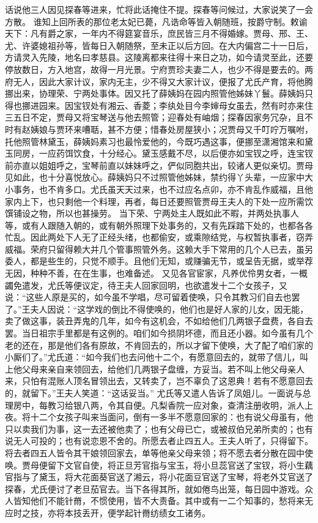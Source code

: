 \documentclass[12pt,oneside]{book}
\begin{document}
话说他三人因见探春等进来，忙将此话掩住不提。探春等问候过，大家说笑了一会方散。
谁知上回所表的那位老太妃已薨，凡诰命等皆入朝随班，按爵守制。敕谕天下：凡有爵之家，一年内不得筵宴音乐，庶民皆三月不得婚嫁。贾母、邢、王、尤、许婆媳祖孙等，皆每日入朝随祭，至未正以后方回。在大内偏宫二十一日后，方请灵入先陵，地名曰孝慈县。这陵离都来往得十来日之功，如今请灵至此，还要停放数日，方入地宫，故得一月光景。宁府贾珍夫妻二人，也少不得是要去的。两府无人，因此大家计议，家内无主，少不得又大家计议，便报了尤氏产育，将他腾挪出来，协理荣、宁两处事体。因又托了薛姨妈在园内照管他姊妹丫鬟。薛姨妈只得也挪进园来。因宝钗处有湘云、香菱；李纨处目今李婶母女虽去，然有时亦来住三五日不定，贾母又将宝琴送与他去照管；迎春处有岫烟；探春因家务冗杂，且不时有赵姨娘与贾环来嘈聒，甚不方便；惜春处房屋狭小；况贾母又千叮咛万嘱咐，托他照管林黛玉，薛姨妈素习也最怜爱他的，今既巧遇这事，便挪至潇湘馆来和黛玉同房，一应药饵饮食，十分经心。黛玉感戴不尽，以后便亦如宝钗之呼，连宝钗前亦直以姐姐呼之，宝琴前直以妹妹呼之，俨似同胞共出，较诸人更似亲切。贾母见如此，也十分喜悦放心。薛姨妈只不过照管他姊妹，禁约得丫头辈，一应家中大小事务，也不肯多口。尤氏虽天天过来，也不过应名点卯，亦不肯乱作威福，且他家内上下，也只剩他一个料理，再者，每日还要照管贾母王夫人的下处一应所需饮馔铺设之物，所以也甚操劳。
当下荣、宁两处主人既如此不暇，并两处执事人等，或有人跟随入朝的，或有朝外照理下处事务的，又有先踩踏下处的，也都各各忙乱。因此两处下人无了正经头绪，也都偷安，或乘隙结党，与权暂执事者，窃弄威福。荣府只留得赖大并几个管事照管外务。这赖大手下常用的几个人已去，虽另委人，都是些生的，只觉不顺手。且他们无知，或赚骗无节，或呈告无据，或举荐无因，种种不善，在在生事，也难备述。
又见各官宦家，凡养优伶男女者，一概蠲免遣发，尤氏等便议定，待王夫人回家回明，也欲遣发十二个女孩子，又说：“这些人原是买的，如今虽不学唱，尽可留着使唤，只令其教习们自去也罢了。”王夫人因说：“这学戏的倒比不得使唤的，他们也是好人家的儿女，因无能，卖了做这事，装丑弄鬼的几年，如今有这机会，不如给他们几两银子盘费，各自去罢。当日祖宗手里都是有这例的。咱们如今损阴坏德，而且还小器。如今虽有几个老的还在，那是他们各有原故，不肯回去的，所以才留下使唤，大了配了咱们家的小厮们了。”尤氏道：“如今我们也去问他十二个，有愿意回去的，就带了信儿，叫上他父母来亲自来领回去，给他们几两银子盘缠，方妥当。若不叫上他父母亲人来，只怕有混账人顶名冒领出去，又转卖了，岂不辜负了这恩典！若有不愿意回去的，就留下。”王夫人笑道：“这话妥当。”
尤氏等又遣人告诉了凤姐儿。一面说与总理房中，每教习给银八两，令其自便。凡梨香院一应对象，查清注册收明，派人上夜。将十二个女孩子叫来当面问，倒有一多半不愿意回家的：也有说父母虽有，他只以卖我们为事，这一去还被他卖了；也有父母已亡，或被叔伯兄弟所卖的；也有说无人可投的；也有说恋恩不舍的。所愿去者止四五人。王夫人听了，只得留下。将去者四五人皆令其干娘领回家去，单等他亲父母来领；将不愿去者分散在园中使唤。贾母便留下文官自使，将正旦芳官指与宝玉，将小旦蕊官送了宝钗，将小生藕官指与了黛玉，将大花面葵官送了湘云，将小花面豆官送了宝琴，将老外艾官送了探春，尤氏便讨了老旦茄官去。当下各得其所，就如倦鸟出笼，每日园中游戏。众人皆知他们不能针黹，不惯使用，皆不大责备。其中或有一二个知事的，愁将来无应时之技，亦将本技丢开，便学起针黹纺绩女工诸务。
\end{document}
